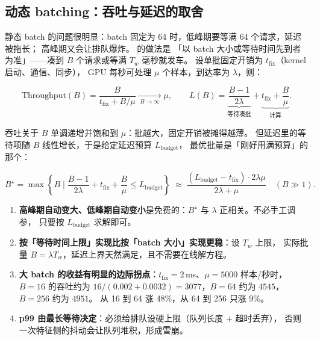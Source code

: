 \subsection{动态 batching：吞吐与延迟的取舍}

静态 batch 的问题很明显：batch 固定为 64 时，低峰期要等满 64 个请求，延迟被拖长；
高峰期又会让排队爆炸。 的做法是
「以 batch 大小或等待时间先到者为准」——凑到 $B$ 个请求或等满 $T_w$ 毫秒就发车。
设单批固定开销为 $t_{\text{fix}}$（kernel 启动、通信、同步），
GPU 每秒可处理 $\mu$ 个样本，到达率为 $\lambda$，则：

\begin{equation}
\text{Throughput}(B) = \frac{B}{t_{\text{fix}} + B/\mu} \xrightarrow[\;B \to \infty\;]{} \mu,
\qquad
L(B) = \underbrace{\frac{B-1}{2\lambda}}_{\text{等待凑批}} + \underbrace{t_{\text{fix}} + \frac{B}{\mu}}_{\text{计算}} .
\label{eq:dynamic-batching}
\end{equation}

吞吐关于 $B$ 单调递增并饱和到 $\mu$：批越大，固定开销被摊得越薄。
但延迟里的等待项随 $B$ 线性增长，于是给定延迟预算 $L_{\text{budget}}$，
最优批量是「刚好用满预算」的那个：

\begin{equation}
B^{\star} = \max\left\{ B \;\Big|\; \frac{B-1}{2\lambda} + t_{\text{fix}} + \frac{B}{\mu} \le L_{\text{budget}} \right\}
\;\approx\; \frac{(L_{\text{budget}} - t_{\text{fix}}) \cdot 2\lambda\mu}{2\lambda + \mu} \quad (B \gg 1).
\label{eq:batch-optimal}
\end{equation}

\begin{formulacard}
\begin{enumerate}
  \item \textbf{高峰期自动变大、低峰期自动变小}是免费的：$B^{\star}$ 与 $\lambda$ 正相关。不必手工调参，
        只要按 $L_{\text{budget}}$ 求解即可。
  \item \textbf{按「等待时间上限」实现比按「batch 大小」实现更稳}：设 $T_w$ 上限，
        实际批量 $B = \lambda T_w$，延迟上界天然满足，且不需要在线解方程。
  \item \textbf{大 batch 的收益有明显的边际拐点}：$t_{\text{fix}}=2$\,ms、$\mu=5000$ 样本/秒时，
        $B=16$ 的吞吐约为 $16/(0.002+0.0032)=3077$，$B=64$ 约为 $4545$，$B=256$ 约为 $4951$。
        从 16 到 64 涨 48\%，从 64 到 256 只涨 9\%。
  \item \textbf{p99 由最长等待决定}：必须给排队设硬上限（队列长度 + 超时丢弃），
        否则一次特征侧的抖动会让队列堆积，形成雪崩。
\end{enumerate}
\end{formulacard}

